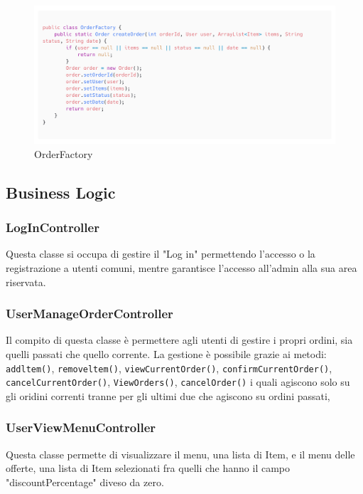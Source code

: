 \documentclass{article}
\begin{document}
\begin{figure}[h]
    \includegraphics[width=1.0\linewidth]{imgs/snippets/Code_OrderFactory.png}
    \caption{OrderFactory}
    \label{orderFactory}
\end{figure}

\newpage
\subsection{Business Logic}

\subsubsection{LogInController}
Questa classe si occupa di gestire il "Log in" permettendo l'accesso o la registrazione a utenti comuni, mentre garantisce l'accesso all'admin alla sua area riservata.

\subsubsection{UserManageOrderController}
Il compito di questa classe è permettere agli utenti di gestire i propri ordini, sia quelli passati che quello corrente. La gestione è possibile grazie ai metodi: \texttt{addltem()}, \texttt{removeltem()}, \texttt{viewCurrentOrder()}, \texttt{confirmCurrentOrder()}, \\ \texttt{cancelCurrentOrder()}, \texttt{ViewOrders()}, \texttt{cancelOrder()} i quali agiscono solo su gli oridini correnti tranne per gli ultimi due che agiscono su ordini passati,

\subsubsection{UserViewMenuController}
Questa classe permette di visualizzare il menu, una lista di Item, e il menu delle offerte, una lista di Item selezionati fra quelli che hanno il campo "discountPercentage" diveso da zero.
\end{document}

